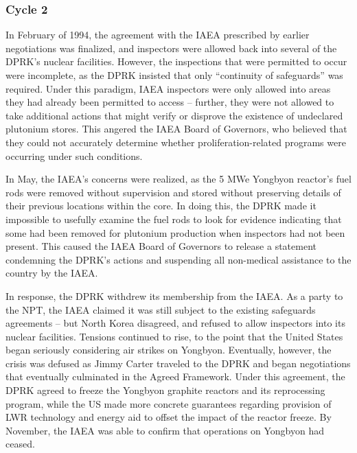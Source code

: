 \documentclass{article}
\begin{document}
\subsubsection{Cycle 2}


In February of 1994, the agreement with the IAEA prescribed by earlier negotiations was finalized, and inspectors were allowed back into several of the DPRK’s nuclear facilities\cite{davenport}. However, the inspections that were permitted to occur were incomplete, as the DPRK insisted that only “continuity of safeguards” was required\cite{iaea09}. Under this paradigm, IAEA inspectors were only allowed into areas they had already been permitted to access – further, they were not allowed to take additional actions that might verify or disprove the existence of undeclared plutonium stores. This angered the IAEA Board of Governors, who believed that they could not accurately determine whether proliferation-related programs were occurring under such conditions\cite{davenport}.

In May, the IAEA’s concerns were realized, as the 5 MWe Yongbyon reactor’s fuel rods were removed without supervision and stored without preserving details of their previous locations within the core. In doing this, the DPRK made it impossible to usefully examine the fuel rods to look for evidence indicating that some had been removed for plutonium production when inspectors had not been present\cite{nobacksies}. This caused the IAEA Board of Governors to release a statement condemning the DPRK’s actions and suspending all non-medical assistance to the country by the IAEA\cite{iaea94}.

In response, the DPRK withdrew its membership from the IAEA. As a party to the NPT, the IAEA claimed it was still subject to the existing safeguards agreements – but North Korea disagreed, and refused to allow inspectors into its nuclear facilities\cite{iaea09}. Tensions continued to rise, to the point that the United States began seriously considering air strikes on Yongbyon\cite{jun}. Eventually, however, the crisis was defused as Jimmy Carter traveled to the DPRK and began negotiations that eventually culminated in the Agreed Framework\cite{nti15}. Under this agreement, the DPRK agreed to freeze the Yongbyon graphite reactors and its reprocessing program, while the US made more concrete guarantees regarding provision of LWR technology and energy aid to offset the impact of the reactor freeze\cite{agreed}. By November, the IAEA was able to confirm that operations on Yongbyon had ceased\cite{davenport}.
\end{document}
